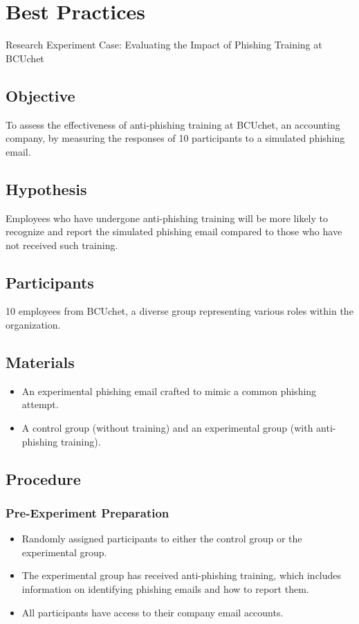 \documentclass[conference]{IEEEtran}
\begin{document}
\section{Best Practices}

Research Experiment Case: Evaluating the Impact of Phishing Training at BCUchet

\subsection{Objective}
To assess the effectiveness of anti-phishing training at BCUchet, an accounting company, by measuring the responses of 10 participants to a simulated phishing email.

\subsection{Hypothesis} Employees who have undergone anti-phishing training will be more likely to recognize and report the simulated phishing email compared to those who have not received such training.

\subsection{Participants}
10 employees from BCUchet, a diverse group representing various roles within the organization.

\subsection{Materials}
\begin{itemize}
\item An experimental phishing email crafted to mimic a common phishing attempt.
\item A control group (without training) and an experimental group (with anti-phishing training).
\end{itemize}


\subsection{Procedure}

\subsubsection{Pre-Experiment Preparation}
\begin{itemize}
    \item  Randomly assigned participants to either the control group or the experimental group.
    \item The experimental group has received anti-phishing training, which includes information on identifying phishing emails and how to report them.
    \item All participants have access to their company email accounts.

\end{itemize}
\end{document}
